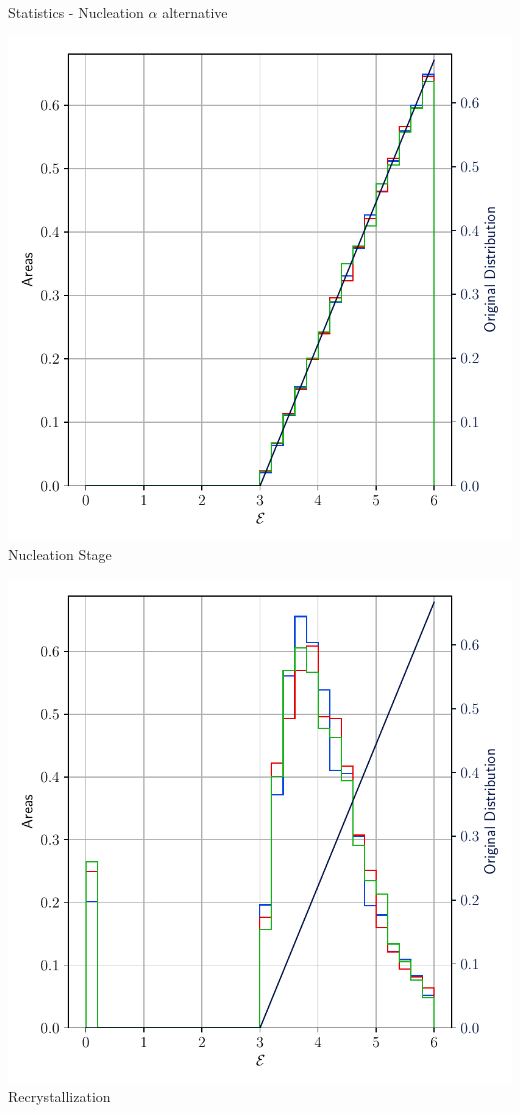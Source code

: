 \documentclass[usenames,dvipsnames]{beamer}
\begin{document}
\begin{frame}{Statistics - Nucleation $\alpha$ alternative}
\small
    \begin{minipage}{0.5\textwidth}
    \centering
    \includegraphics[scale=0.35]{figures/stored_energy/SE/se/000000_nuclalternative_set.pdf}\\
    Nucleation Stage
    \end{minipage}%
    \begin{minipage}{0.5\textwidth}
    \centering
    \includegraphics[scale=0.35]{figures/stored_energy/SE/se/000070_nuclalternative_set.pdf}\\
    Recrystallization
    \end{minipage}
\end{frame}
\end{document}
